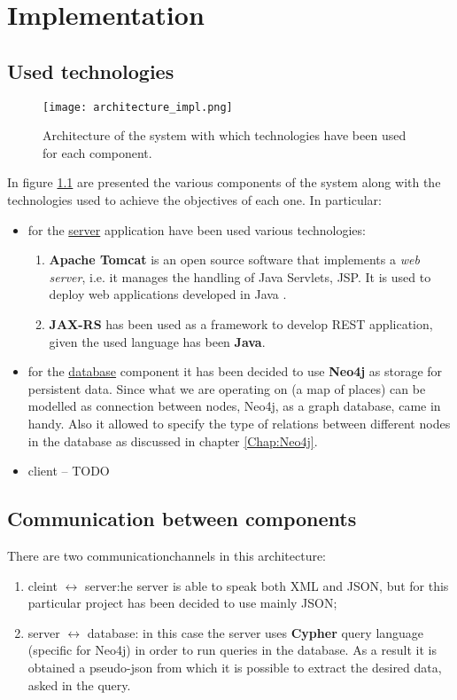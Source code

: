 \chapter{Implementation}\label{Chap:Impl}
\section{Used technologies}
\begin{figure}[!htb]
   \centering
   \texttt{[image: architecture\_impl.png]}
   \caption{Architecture of the system with which technologies have been used for each component.}\label{Fig:ArchImpl}
\end{figure}
In figure \ref{Fig:ArchImpl} are presented the various components of the system along with the technologies used to achieve the objectives of each one. In particular:
\begin{itemize}
  \item for the \underline{server} application have been used various technologies:
    \begin{enumerate}
      \item \textbf{Apache Tomcat} is an open source software that implements a \textit{web server}, i.e. it manages the handling of Java Servlets, JSP. It is used to deploy web applications developed in Java \parencite{tomcat}.
      \item \textbf{JAX-RS} has been used as a framework to develop REST application, given the used language has been \textbf{Java}.
    \end{enumerate}
  \item for the \underline{database} component it has been decided to use \textbf{Neo4j} as
    storage for persistent data. Since what we are operating on (a map of places) can be modelled as connection between nodes, Neo4j, as a graph database, came in handy. Also it allowed to specify the type of relations between different nodes in the database as discussed in chapter \ref{Chap:Neo4j}.
  \item client -- TODO
\end{itemize}


\section{Communication between components}
There are two communicationchannels in this architecture:
\begin{enumerate}
  \item cleint $\leftrightarrow$ server:he server is able to speak both XML and JSON, but for this particular project has been decided to use mainly JSON;
  \item server $\leftrightarrow$ database: in this case the server uses \textbf{Cypher} query language (specific for Neo4j) in order to run queries in the database. As a result it is obtained a pseudo-json from which it is possible to extract the desired data, asked in the query.
\end{enumerate}

